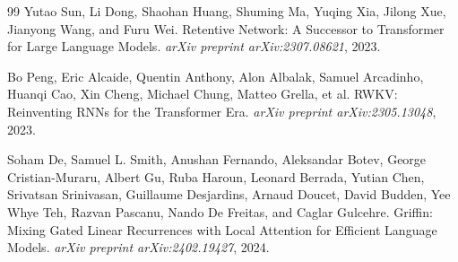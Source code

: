 \documentclass[10pt]{article} %
\begin{document}
\begin{thebibliography}{99}
Yutao Sun, Li Dong, Shaohan Huang, Shuming Ma, Yuqing Xia, Jilong Xue, Jianyong Wang, and Furu Wei.
\newblock Retentive Network: A Successor to Transformer for Large Language Models.
\newblock \emph{arXiv preprint arXiv:2307.08621}, 2023.

Bo Peng, Eric Alcaide, Quentin Anthony, Alon Albalak, Samuel Arcadinho, Huanqi Cao, Xin Cheng, Michael Chung, Matteo Grella, et al.
\newblock RWKV: Reinventing RNNs for the Transformer Era.
\newblock \emph{arXiv preprint arXiv:2305.13048}, 2023.

Soham De, Samuel L. Smith, Anushan Fernando, Aleksandar Botev, George Cristian-Muraru, Albert Gu, Ruba Haroun, Leonard Berrada, Yutian Chen, Srivatsan Srinivasan, Guillaume Desjardins, Arnaud Doucet, David Budden, Yee Whye Teh, Razvan Pascanu, Nando De Freitas, and Caglar Gulcehre.
\newblock Griffin: Mixing Gated Linear Recurrences with Local Attention for Efficient Language Models.
\newblock \emph{arXiv preprint arXiv:2402.19427}, 2024.

\end{thebibliography}
\end{document}
